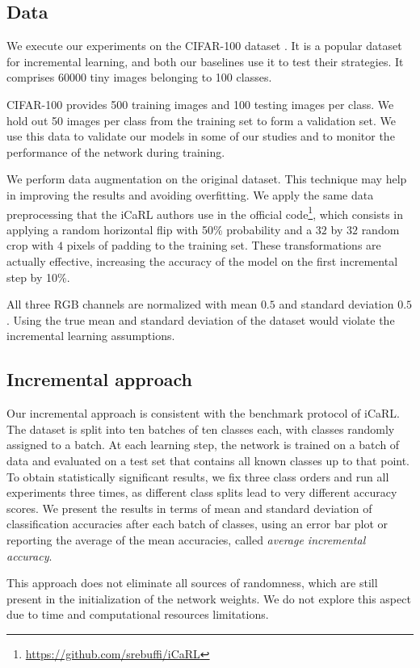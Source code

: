 \documentclass[10pt,twocolumn,letterpaper]{article}
\begin{document}
\subsection{Data}
We execute our experiments on the CIFAR-100 dataset \cite{krizhevsky:2009}. It is a popular dataset for incremental learning, and both our baselines \cite{li:2016, rebuffi:2017} use it to test their strategies. It comprises 60000 tiny images belonging to 100 classes.

CIFAR-100 provides 500 training images and 100 testing images per class. We hold out 50 images per class from the training set to form a validation set. We use this data to validate our models in some of our studies and to monitor the performance of the network during training.

We perform data augmentation on the original dataset. This technique may help in improving the results and avoiding overfitting. We apply the same data preprocessing that the iCaRL authors use in the official code\footnote{\url{https://github.com/srebuffi/iCaRL}}, which consists in applying a random horizontal flip with 50\% probability and a $32$ by $32$ random crop with $4$ pixels of padding to the training set. These transformations are actually effective, increasing the accuracy of the model on the first incremental step by 10\%.

All three RGB channels are normalized with mean $0.5$ and standard deviation $0.5$. Using the true mean and standard deviation of the dataset would violate the incremental learning assumptions.

\subsection{Incremental approach}
Our incremental approach is consistent with the benchmark protocol of iCaRL. The dataset is split into ten batches of ten classes each, with classes randomly assigned to a batch. At each learning step, the network is trained on a batch of data and evaluated on a test set that contains all known classes up to that point. To obtain statistically significant results, we fix three class orders and run all experiments three times, as different class splits lead to very different accuracy scores. We present the results in terms of mean and standard deviation of classification accuracies after each batch of classes, using an error bar plot or reporting the average of the mean accuracies, called \emph{average incremental accuracy}.

This approach does not eliminate all sources of randomness, which are still present in the initialization of the network weights. We do not explore this aspect due to time and computational resources limitations.
\end{document}
